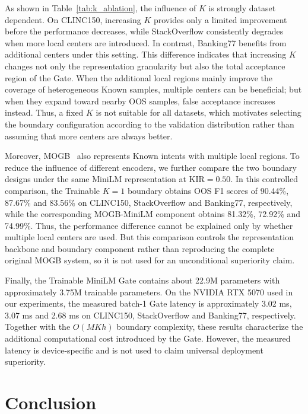 \documentclass[11pt]{article}
\begin{document}
As shown in Table~\ref{tab:k_ablation}, the influence of $K$ is strongly dataset dependent. On CLINC150, increasing $K$ provides only a limited improvement before the performance decreases, while StackOverflow consistently degrades when more local centers are introduced. In contrast, Banking77 benefits from additional centers under this setting. This difference indicates that increasing $K$ changes not only the representation granularity but also the total acceptance region of the Gate. When the additional local regions mainly improve the coverage of heterogeneous Known samples, multiple centers can be beneficial; but when they expand toward nearby OOS samples, false acceptance increases instead. Thus, a fixed $K$ is not suitable for all datasets, which motivates selecting the boundary configuration according to the validation distribution rather than assuming that more centers are always better.

Moreover, MOGB~\citep{li2025multi} also represents Known intents with multiple local regions. To reduce the influence of different encoders, we further compare the two boundary designs under the same MiniLM representation at KIR$=0.50$. In this controlled comparison, the Trainable $K=1$ boundary obtains OOS F1 scores of 90.44\%, 87.67\% and 83.56\% on CLINC150, StackOverflow and Banking77, respectively, while the corresponding MOGB-MiniLM component obtains 81.32\%, 72.92\% and 74.99\%. Thus, the performance difference cannot be explained only by whether multiple local centers are used. But this comparison controls the representation backbone and boundary component rather than reproducing the complete original MOGB system, so it is not used for an unconditional superiority claim.

Finally, the Trainable MiniLM Gate contains about 22.9M parameters with approximately 3.75M trainable parameters. On the NVIDIA RTX 5070 used in our experiments, the measured batch-1 Gate latency is approximately 3.02 ms, 3.07 ms and 2.68 ms on CLINC150, StackOverflow and Banking77, respectively. Together with the $O(MKh)$ boundary complexity, these results characterize the additional computational cost introduced by the Gate. However, the measured latency is device-specific and is not used to claim universal deployment superiority.


\section{Conclusion}
\end{document}
